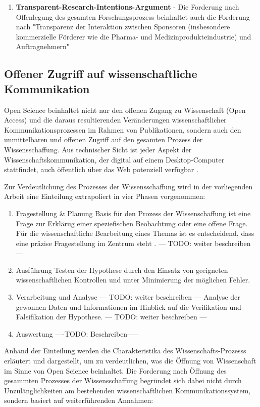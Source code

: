 \begin{enumerate}
\item \textbf{Transparent-Research-Intentions-Argument} - Die Forderung nach Offenlegung des gesamten Forschungsprozess beinhaltet auch die Forderung nach "Transparenz der Interaktion zwischen Sponsoren (insbesondere kommerzielle Förderer wie die Pharma- und Medizinprodukteindustrie) und Auftragnehmern" \cite{Stengel_2013} 
\end{enumerate}

\subsection{Offener Zugriff auf wissenschaftliche Kommunikation}
Open Science beinhaltet nicht nur den offenen Zugang zu Wissenschaft (Open Access) und die daraus resultierenden Veränderungen wissenschaftlicher Kommunikationsprozessen im Rahmen von Publikationen, sondern auch den unmittelbaren und offenen Zugriff auf den gesamten Prozess der Wissensschaffung. Aus technischer Sicht ist jeder Aspekt der Wissenschaftskommunikation, der digital auf einem Desktop-Computer stattfindet, auch öffentlich über das Web potenziell verfügbar \cite{mietchen2012wissenschaft}. 

Zur Verdeutlichung des Prozesses der Wissensschaffung wird in der vorliegenden Arbeit eine Einteilung extrapoliert in vier Phasen vorgenommen:
\begin{enumerate}
\item Fragestellung & Planung
Basis für den Prozess der Wissenschaffung ist eine Frage zur Erklärug einer speziefischen Beobachtung oder eine offene Frage\cite{suchen}. Für die wissenschaftliche Bearbeitung eines Themas ist es entscheidend, dass eine präzise Fragestellung im Zentrum steht \cite{suchen}. --- TODO: weiter beschreiben ---
\item Ausführung
Testen der Hypothese durch den Einsatz von geeigneten wissenschaftlichen Kontrollen und unter Minimierung der möglichen Fehler.
\item Verarbeitung und Analyse --- TODO: weiter beschreiben ---
Analyse der gewonnen Daten und Informationen im Hinblick auf die Verifikation und Falsifikation der Hypothese. --- TODO: weiter beschreiben ---
\item Auswertung
----TODO: Beschreiben-----
\end{enumerate}

Anhand der Einteilung werden die Charakteristika des Wissenschafts-Prozesss erläutert und dargestellt, um zu verdeutlichen, was die Öffnung von Wissenschaft im Sinne von Open Science beinhaltet. Die Forderung nach Öffnung des gesammten Prozesses der Wissensschaffung begründet sich dabei nicht durch Unzulänglichkeiten am bestehenden wissenschaftlichen Kommunikationssystem, sondern basiert auf weiterführenden Annahmen:

